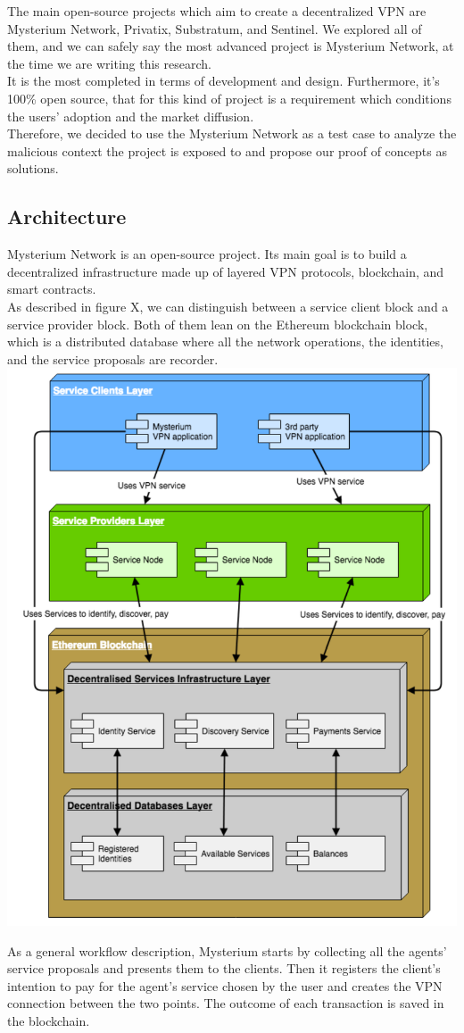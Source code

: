 \documentclass[12pt]{article}
\begin{document}
	The main open-source projects which aim to create a decentralized VPN are Mysterium Network, Privatix, Substratum, and Sentinel. We explored all of them, and we can safely say the most advanced project is Mysterium Network, at the time we are writing this research.\\It is the most completed in terms of development and design. Furthermore, it's 100\% open source, that for this kind of project is a requirement which conditions the users' adoption and the market diffusion.\\
	Therefore, we decided to use the Mysterium Network as a test case to analyze the malicious context the project is exposed to and propose our proof of concepts as solutions.
	
	\subsection{Architecture}
	Mysterium Network is an open-source project. Its main goal is to build a decentralized infrastructure made up of layered VPN protocols, blockchain, and smart contracts.\\
	As described in figure X, we can distinguish between a service client block and a service provider block. Both of them lean on the Ethereum blockchain block, which is a distributed database where all the network operations, the identities, and the service proposals are recorder.\\

	\includegraphics[width=0.5\linewidth]{images/mysterium_architecture.png}
		
	As a general workflow description, Mysterium starts by collecting all the agents' service proposals and presents them to the clients. Then it registers the client's intention to pay for the agent's service chosen by the user and creates the VPN connection between the two points. The outcome of each transaction is saved in the blockchain.\\
	
\end{document}
